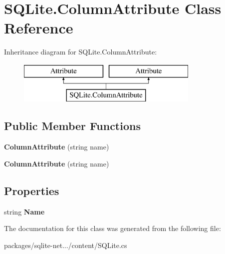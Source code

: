 \hypertarget{classSQLite_1_1ColumnAttribute}{\section{S\-Q\-Lite.\-Column\-Attribute Class Reference}
\label{classSQLite_1_1ColumnAttribute}
}
Inheritance diagram for S\-Q\-Lite.\-Column\-Attribute\-:\begin{figure}[H]
\begin{center}
\leavevmode
\includegraphics[height=2.000000cm]{classSQLite_1_1ColumnAttribute}
\end{center}
\end{figure}
\subsection*{Public Member Functions}
\begin{DoxyCompactItemize}
\item 
\hypertarget{classSQLite_1_1ColumnAttribute_aa7ecb3d322d1fde710f51558b314ad6f}{{\bfseries Column\-Attribute} (string name)}\label{classSQLite_1_1ColumnAttribute_aa7ecb3d322d1fde710f51558b314ad6f}

\item 
\hypertarget{classSQLite_1_1ColumnAttribute_aa7ecb3d322d1fde710f51558b314ad6f}{{\bfseries Column\-Attribute} (string name)}\label{classSQLite_1_1ColumnAttribute_aa7ecb3d322d1fde710f51558b314ad6f}

\end{DoxyCompactItemize}
\subsection*{Properties}
\begin{DoxyCompactItemize}
\item 
\hypertarget{classSQLite_1_1ColumnAttribute_a5b56793a04c2dbb1fbe12f3ac4610ad3}{string {\bfseries Name}}\label{classSQLite_1_1ColumnAttribute_a5b56793a04c2dbb1fbe12f3ac4610ad3}

\end{DoxyCompactItemize}


The documentation for this class was generated from the following file\-:\begin{DoxyCompactItemize}
\item 
packages/sqlite-\/net.../content/S\-Q\-Lite.\-cs\end{DoxyCompactItemize}
